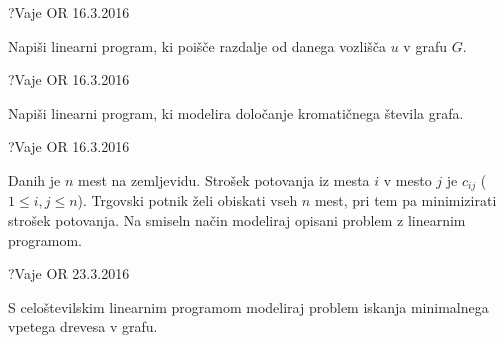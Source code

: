 \begin{naloga}{?}{Vaje OR 16.3.2016}
\begin{vprasanje}
Napiši linearni program,
ki poišče razdalje od danega vozlišča $u$ v grafu $G$.
\end{vprasanje}
\begin{odgovor}
\end{odgovor}
\end{naloga}


\begin{naloga}{?}{Vaje OR 16.3.2016}
\begin{vprasanje}
Napiši linearni program,
ki modelira določanje kromatičnega števila grafa.

\end{vprasanje}
\begin{odgovor}
\end{odgovor}
\end{naloga}


\begin{naloga}{?}{Vaje OR 16.3.2016}
\begin{vprasanje}
Danih je $n$ mest na zemljevidu.
Strošek potovanja iz mesta $i$ v mesto $j$ je $c_{ij}$ ($1 \le i, j \le n$).
Trgovski potnik želi obiskati vseh $n$ mest,
pri tem pa minimizirati strošek potovanja.
Na smiseln način modeliraj opisani problem z linearnim programom.
\end{vprasanje}
\begin{odgovor}
\end{odgovor}
\end{naloga}


\begin{naloga}{?}{Vaje OR 23.3.2016}
\begin{vprasanje}
S celoštevilskim linearnim programom
modeliraj problem iskanja minimalnega vpetega drevesa v grafu.
\end{vprasanje}
\begin{odgovor}
\end{odgovor}
\end{naloga}
